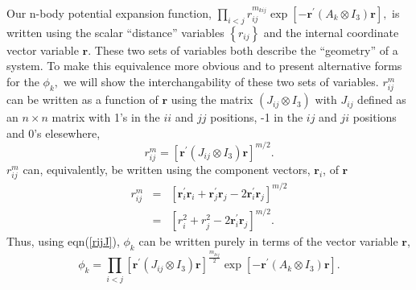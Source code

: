\documentclass[12pt,thmsa]{article}
\begin{document}
Our n-body potential expansion function, $\prod_{i<j}r_{ij}^{m_{kij}}\exp
\left[ -\mathbf{r}^{\prime }(A_k\otimes I_3)\mathbf{r}\right] ,$ is written
using the scalar ``distance'' variables $\left\{ r_{ij}\right\} $ and the
internal coordinate vector variable $\mathbf{r.}$ These two sets of
variables both  describe the ``geometry'' of a system. To make this
equivalence more obvious and to present alternative forms for the $\phi _k,$
we will show the interchangability of these two sets of variables. $r_{ij}^m$
can be written as a function of $\mathbf{r}$ using the matrix $\left(
J_{ij}\otimes I_3\right) $ with $J_{ij}$ defined as an $n\times n$ matrix
with 1's in the $ii$ and $jj$ positions, -1 in the $ij$ and $ji$ positions
and 0's elesewhere\cite{Poshusta83,Kinghorn95a}, 
\begin{equation}
r_{ij}^m=\left[ \mathbf{r}^{\prime }(J_{ij}\otimes I_3)\mathbf{r}\right]
^{m/2}.  \label{rijJ}
\end{equation}
$r_{ij}^m$ can, equivalently, be written using the component vectors, $%
\mathbf{r}_i$, of $\mathbf{r}$ 
\begin{eqnarray}
r_{ij}^m &=&\left[ \mathbf{r}_i^{\prime }\mathbf{r}_i+\mathbf{r}_j^{\prime }%
\mathbf{r}_j-2\mathbf{r}_i^{\prime }\mathbf{r}_j\right] ^{m/2} \\
&=&\left[ r_i^2+r_j^2-2\mathbf{r}_i^{\prime }\mathbf{r}_j\right] ^{m/2}.
\end{eqnarray}
Thus, using eqn(\ref{rijJ}), $\phi _k$ can be written purely in terms of the
vector variable $\mathbf{r}$, 
\begin{equation}
\phi _k=\prod_{i<j}\left[ \mathbf{r}^{\prime }(J_{ij}\otimes I_3)\mathbf{r}%
\right] ^{\frac{m_{kij}}2}\exp \left[ -\mathbf{r}^{\prime }(A_k\otimes I_3)%
\mathbf{r}\right] .  \label{phir}
\end{equation}
\end{document}
